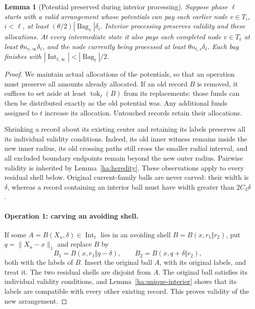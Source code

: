 \documentclass[11pt]{amsart}
\newtheorem{lemma}[theorem]{Lemma}
\theoremstyle{definition}
\theoremstyle{remark}
\numberwithin{equation}{section}
\begin{document}
\begin{lemma}[Potential preserved during interior processing]
\label{ha:construction}
Suppose phase $\ell$ starts with a valid arrangement whose potentials
can pay each earlier node $v\in T_i$, $i<\ell$, at least
$(\theta/2)|\operatorname{Bag}_v|\delta_i$.  Interior processing preserves
validity and these allocations.  At every intermediate state it also
pays each completed node $v\in T_\ell$ at least
$\theta n_{v,\infty}\delta_\ell$, and the node currently being processed
at least $\theta n_{t,s}\delta_\ell$.
Each bag finishes with
$|\operatorname{Int}_{t,\infty}|<|\operatorname{Bag}_t|/2$.
\end{lemma}

\begin{proof}
We maintain actual allocations of the potentials, so that an operation
must preserve all amounts already allocated.  If an old record $B$ is
removed, it suffices to set aside at least
$\operatorname{tok}_\ell(B)$ from its replacements: those funds can
then be distributed exactly as the old potential was.  Any additional
funds assigned to $t$ increase its allocation.  Untouched records retain
their allocations.

Shrinking a record about its existing center and retaining its labels
preserves all its individual validity conditions.  Indeed, its old
inner witness remains inside the new inner radius, its old crossing
paths still cross the smaller radial interval, and all excluded
boundary endpoints remain beyond the new outer radius.  Pairwise
validity is inherited by Lemma~\ref{ha:heredity}.  These observations
apply to every residual shell below.  Original current-family balls
are never carved: their width is $\delta$, whereas a record containing
an interior ball must have width greater than $2C_3\delta$.

\paragraph{\textbf{Operation 1: carving an avoiding shell.}}
If some $A=B(X_u,\delta)\in\operatorname{Int}_t$ lies in an avoiding
shell $B=B(x,r_1\Vert r_2)$, put $q=\|X_u-x\|_1$ and replace $B$ by
\[
 B_1=B(x,r_1\Vert q-\delta),\qquad
 B_2=B(x,q+\delta\Vert r_2),
\]
both with the labels of $B$.  Insert the original ball $A$, with its
original labels, and treat it.  The two residual shells are disjoint
from $A$.  The original ball satisfies its individual validity
conditions, and Lemma~\ref{ha:unique-interior} shows that its labels
are compatible with every other existing record.  This proves validity
of the new arrangement.


\end{proof}
\end{document}
